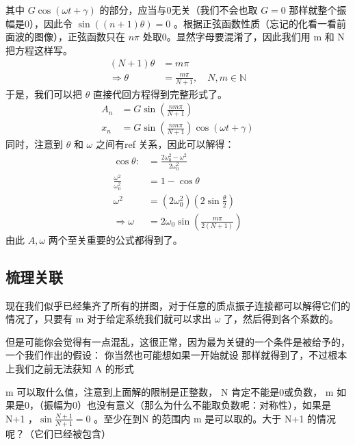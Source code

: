 \documentclass[11pt]{book}
\begin{document}
其中 \(G\cos(\omega t+\gamma)\) 的部分，应当与0无关（我们不会也取 \(G=0\) 那样就整个振幅是0），因此令 \(\sin((n+1)\theta)=0\) 。根据正弦函数性质（忘记的化看一看前面波的图像），正弦函数只在 \(n\pi\) 处取0。显然字母要混淆了，因此我们用 m 和 N 把方程这样写。
\begin{equation}
\label{eq:20}
\begin{split}
(N+1)\theta &= m\pi\\
\Rightarrow \theta &= \frac{m\pi}{N+1},\quad N,m \in \mathbb{N}
\end{split}
\end{equation}
于是，我们可以把 \(\theta\) 直接代回方程得到完整形式了。
\begin{equation}
\label{eq:29}
\begin{split}
A_n & = G\sin(\frac{nm\pi}{N+1})\\
x_{n} & = G\sin(\frac{nm\pi}{N+1})\cos(\omega t+\gamma)
\end{split}
\end{equation}
同时，注意到 \(\theta\) 和 \(\omega\) 之间有ref 关系，因此可以解得：
\begin{equation}
\label{eq:32}
\begin{split}
\cos\theta:&=\frac{2\omega_0^2-\omega^2}{2\omega^2_0}\\
\frac{\omega^2}{\omega_0^2}&=1-\cos\theta \\
\omega^2&=(2\omega_0^2)(2\sin \frac{\theta}{2})\\
\Rightarrow\omega&=2\omega_0\sin(\frac{m\pi}{2(N+1)})
\end{split}
\end{equation}
由此 \(A,\omega\) 两个至关重要的公式都得到了。
\subsection{梳理关联}
\label{sec:org4c38537}
现在我们似乎已经集齐了所有的拼图，对于任意的质点振子连接都可以解得它们的情况了，只要有 m 对于给定系统我们就可以求出 \(\omega\) 了，然后得到各个系数的。

但是可能你会觉得有一点混乱，这很正常，因为最为关键的一个条件是被给予的，一个我们作出的假设：
你当然也可能想如果一开始就设 
那样就得到了，不过根本上我们之前无法获知 A 的形式

m 可以取什么值，注意到上面解的限制是正整数， N 肯定不能是0或负数， m 如果是0，（振幅为0）也没有意义（那么为什么不能取负数呢：对称性），如果是 N+1 ，\(\sin \frac{N+1}{N+1}=0\) 。至少在到N 的范围内 m 是可以取的。大于 N+1 的情况呢？（它们已经被包含）
\end{document}

